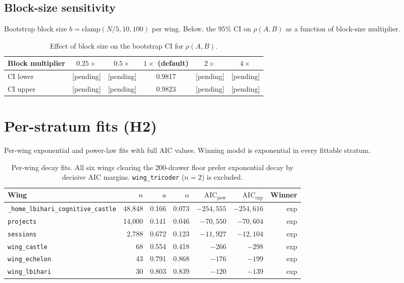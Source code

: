 \subsection{Block-size sensitivity}
Bootstrap block size $b = \mathrm{clamp}(N/5, 10, 100)$ per wing.
Below, the $95\%$ CI on $\rho(A, B)$ as a function of block-size
multiplier.

\begin{table}[h]
\centering
\begin{tabular}{lccccc}
\toprule
Block multiplier & $0.25\times$ & $0.5\times$ & $1\times$ (default) & $2\times$ & $4\times$ \\
\midrule
CI lower & [pending] & [pending] & 0.9817 & [pending] & [pending] \\
CI upper & [pending] & [pending] & 0.9823 & [pending] & [pending] \\
\bottomrule
\end{tabular}
\caption{Effect of block size on the bootstrap CI for $\rho(A, B)$.}
\end{table}

\section{Per-stratum fits (H2)}
Per-wing exponential and power-law fits with full AIC values. Winning
model is exponential in every fittable stratum.

\begin{table}[h]
\centering
\small
\begin{tabular}{lrrrrrr}
\toprule
Wing & $n$ & $a$ & $\alpha$ & $\mathrm{AIC}_{\mathrm{pow}}$ & $\mathrm{AIC}_{\mathrm{exp}}$ & Winner \\
\midrule
\texttt{\_home\_lbihari\_cognitive\_castle} & 48{,}848 & 0.166 & 0.073 & $-254{,}555$ & $-254{,}616$ & exp \\
\texttt{projects}                            & 14{,}000 & 0.141 & 0.046 & $-70{,}550$  & $-70{,}604$  & exp \\
\texttt{sessions}                            &  2{,}788 & 0.672 & 0.123 & $-11{,}927$  & $-12{,}104$  & exp \\
\texttt{wing\_castle}                        &     68 & 0.554 & 0.418 & $-266$       & $-298$       & exp \\
\texttt{wing\_echelon}                       &     43 & 0.791 & 0.868 & $-176$       & $-199$       & exp \\
\texttt{wing\_lbihari}                       &     30 & 0.803 & 0.839 & $-120$       & $-139$       & exp \\
\bottomrule
\end{tabular}
\caption{Per-wing decay fits. All six wings clearing the 200-drawer
floor prefer exponential decay by decisive AIC margins.
\texttt{wing\_tricoder} ($n = 2$) is excluded.}
\end{table}

